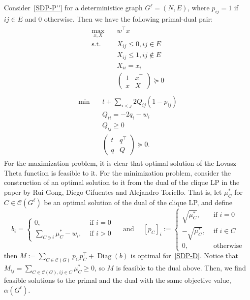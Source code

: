 \documentclass{article}
\newcommand{\Diag}{\operatorname{Diag}}
\begin{document}
Consider~\ref{SDP-P''} for a deterministice graph $G^\ell=(N,E)$, where $p_{ij}=1$ if $ij\in E$ and $0$ otherwise.
Then we have the following primal-dual pair:
\begin{align}
  \begin{split}
    \max_{x,X}\quad &w^\top x\\
    \text{s.t.}\quad &X_{ij}\leq 0,ij\in E\\
    &X_{ij}\leq 1,ij\notin E\\
    &X_{ii}=x_i\\
    &
    \begin{pmatrix}
      1&x^\top\\
      x&X
    \end{pmatrix}\succeq 0
  \end{split}
\end{align}
\begin{align}
  \begin{split}
    \min\quad &t+\sum_{i<j}2Q_{ij}(1-p_{ij})\\
    &Q_{ii}=-2q_i-w_i\\
    &Q_{ij}\geq 0\\
    &\begin{pmatrix}
      t&q^\top\\
      q&Q
    \end{pmatrix}\succeq 0.
  \end{split}
\end{align}
For the maximization problem, it is clear that optimal solution of the Lovasz-Theta function is feasible to it.
For the minimization problem, consider the construction of an optimal solution to it from the dual of the clique LP in the paper by Rui Gong, Diego Cifuentes and Alejandro Toriello.
That is, let $\mu^*_C$ for $C\in\mathcal{C}(G^\ell)$ be an optimal solution of the dual of the clique LP, and define
\begin{equation}
b_{i}=
\begin{cases}
    0,&\text{ if } i =0\\
    \sum_{C\ni i}\mu^*_C-w_i,&\text{ if }i > 0
\end{cases}
\quad\text{ and }\quad
    [p_C]_i:=\begin{cases}
    \sqrt{\mu^*_C},&\text{ if }i=0\\
    -\sqrt{\mu^*_C},&\text{ if }i\in C\\
    0,&\text{ otherwise}
\end{cases}
\end{equation}
then
\(
M := \sum_{C\in \mathcal{C}(G)}p_C p_C^\top+ \Diag(b)
\)
is optimal for~\eqref{SDP-D}.
Notice that $M_{ij}=\sum_{C\in\mathcal{C}(G),ij\in C}\mu_{C}^*\geq 0$,
so $M$ is feasible to the dual above.
Then, we find feasible solutions to the primal and the dual with the same objective value, $\alpha(G^\ell)$.
\end{document}

